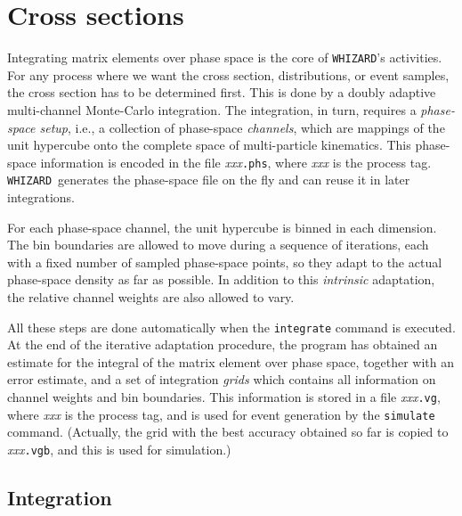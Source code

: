 \documentclass[12pt]{book}
\newcommand{\ttt}[1]{\texttt{#1}}
\newcommand{\whizard}{\texttt{WHIZARD}}
\begin{document}
\section{Cross sections}

Integrating matrix elements over phase space is the core of \whizard's
activities.  For any process where we want the cross section, distributions,
or event samples, the cross section has to be determined first.  This is done
by a doubly adaptive multi-channel Monte-Carlo integration.  The integration,
in turn, requires a \emph{phase-space setup}, i.e., a collection of
phase-space \emph{channels}, which are mappings of the unit hypercube onto the
complete space of multi-particle kinematics.  This phase-space information is
encoded in the file \emph{xxx}\ttt{.phs}, where \emph{xxx} is the process tag.
\whizard\ generates the phase-space file on the fly and can reuse it in later
integrations.

For each phase-space channel, the unit hypercube is binned in each dimension.
The bin boundaries are allowed to move during a sequence of iterations, each
with a fixed number of sampled phase-space points, so they adapt to the actual
phase-space density as far as possible.  In addition to this \emph{intrinsic}
adaptation, the relative channel weights are also allowed to vary.

All these steps are done automatically when the \ttt{integrate} command is
executed.  At the end of the iterative adaptation procedure, the program has
obtained an estimate for the integral of the matrix element over phase space,
together with an error estimate, and a set of integration \emph{grids} which
contains all information on channel weights and bin boundaries.  This
information is stored in a file \emph{xxx}\ttt{.vg}, where \emph{xxx} is the
process tag, and is used for event generation by the \ttt{simulate}
command.  (Actually, the grid with the best accuracy obtained so far
is copied to \emph{xxx}\ttt{.vgb}, and this is used for simulation.)


\subsection{Integration}
\label{sec:integrate}
\end{document}
